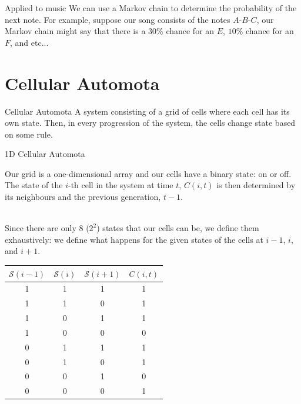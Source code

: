 \documentclass{beamer}
\begin{document}
\begin{frame}{Applied to music}
We can use a Markov chain to determine the probability of the next note. For example, suppose our song consists of the notes $A$-$B$-$C$, our Markov chain might say that there is a $30$\% chance for an $E$, $10$\% chance for an $F$, and etc...
\end{frame}

\section{Cellular Automota}
\begin{frame}{Cellular Automota}
A system consisting of a grid of cells where each cell has its own state. Then, in every progression of the system, the cells change state based on some rule.
\end{frame}

\begin{frame}[allowframebreaks]{1D Cellular Automota}
\par{Our grid is a one-dimensional array and our cells have a binary state: on or off. The state of the $i$-th cell in the system at time $t$, $C(i,t)$ is then determined by its neighbours and the previous generation, $t-1$.\\~\ }

\par{Since there are only $8$ ($2^2$) states that our cells can be, we define them exhaustively: we define what happens for the given states of the cells at $i-1$, $i$, and $i+1$.}
\framebreak
\begin{center}
\begin{tabular}{ c|c|c||c } 
$\mathcal{S}(i-1)$ & $\mathcal{S}(i)$ & $\mathcal{S}(i+1)$ & $C(i,t)$\\
 \hline
 1 & 1 & 1 & 1 \\ 
 1 & 1 & 0 & 1 \\ 
 1 & 0 & 1 & 1 \\
 1 & 0 & 0 & 0 \\
 0 & 1 & 1 & 1 \\
 0 & 1 & 0 & 1 \\
 0 & 0 & 1 & 0 \\
 0 & 0 & 0 & 1
\end{tabular}
\end{center}
\end{frame}
\end{document}
